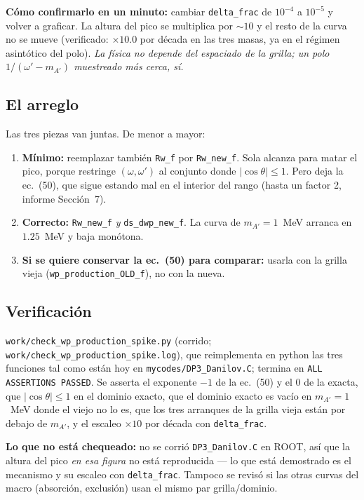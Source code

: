 \documentclass[11pt,a4paper]{article}
\newcommand{\Ap}{A'}
\newcommand{\wpr}{\omega'}
\begin{document}
\medskip
\noindent\textbf{Cómo confirmarlo en un minuto:} cambiar \texttt{delta\_frac} de $10^{-4}$ a $10^{-5}$ y volver a
graficar. La altura del pico se multiplica por $\sim10$ y el resto de la curva no se mueve (verificado: $\times10.0$
por década en las tres masas, ya en el régimen asintótico del polo). \emph{La física no depende del espaciado de la
grilla; un polo $1/(\wpr-m_{\Ap})$ muestreado más cerca, sí.}

\subsection{El arreglo}
Las tres piezas van juntas. De menor a mayor:
\begin{enumerate}\itemsep2pt
\item \textbf{Mínimo:} reemplazar también \texttt{Rw\_f} por \texttt{Rw\_new\_f}. Sola alcanza para matar el pico,
porque restringe $(\omega,\wpr)$ al conjunto donde $|\cos\theta|\le1$. Pero deja la ec.~(50), que sigue estando mal
en el interior del rango (hasta un factor 2, informe Sección~7).
\item \textbf{Correcto:} \texttt{Rw\_new\_f} \emph{y} \texttt{ds\_dwp\_new\_f}. La curva de $m_{\Ap}=1$~MeV arranca
en $1.25$~MeV y baja monótona.
\item \textbf{Si se quiere conservar la ec.~(50) para comparar:} usarla con la grilla vieja
(\texttt{wp\_production\_OLD\_f}), no con la nueva.
\end{enumerate}

\subsection{Verificación}
\texttt{work/check\_wp\_production\_spike.py} (corrido; \texttt{work/check\_wp\_production\_spike.log}), que
reimplementa en python las tres funciones tal como están hoy en \texttt{mycodes/DP3\_Danilov.C}; termina en
\texttt{ALL ASSERTIONS PASSED}. Se asserta el exponente $-1$ de la ec.~(50) y el $0$ de la exacta, que
$|\cos\theta|\le1$ en el dominio exacto, que el dominio exacto es vacío en $m_{\Ap}=1$~MeV donde el viejo no lo es,
que los tres arranques de la grilla vieja están por debajo de $m_{\Ap}$, y el escaleo $\times10$ por década con
\texttt{delta\_frac}.

\smallskip
\noindent\textbf{Lo que no está chequeado:} no se corrió \texttt{DP3\_Danilov.C} en ROOT, así que la altura del pico
\emph{en esa figura} no está reproducida --- lo que está demostrado es el mecanismo y su escaleo con
\texttt{delta\_frac}. Tampoco se revisó si las otras curvas del macro (absorción, exclusión) usan el mismo par
grilla/dominio.
\end{document}
